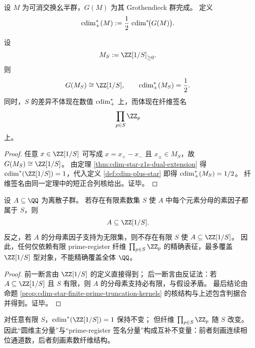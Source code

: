 \begin{definition}[扩展半圆维]\label{def:cdim-plus-star}
设 \(M\) 为可消交换幺半群，\(G(M)\) 为其 Grothendieck 群完成。
定义
\[
\operatorname{cdim}_+^\ast(M):=\frac12\,\operatorname{cdim}^\ast\!\bigl(G(M)\bigr).
\]
\end{definition}

\begin{proposition}[局部化正锥的半圆维与素数签名]\label{prop:cdim-plus-star-localized-cone}
设
\[
M_S:=\ZZ[1/S]_{\ge 0}.
\]
则
\[
G(M_S)\cong \ZZ[1/S],\qquad
\cdim_+^\ast(M_S)=\frac12.
\]
同时，\(S\) 的差异不体现在数值 \(\operatorname{cdim}_+^\ast\) 上，而体现在纤维签名
\[
\prod_{p\in S}\ZZ_p
\]
上。
\end{proposition}
\begin{proof}
任意 \(x\in \ZZ[1/S]\) 可写成 \(x=x_+-x_-\) 且 \(x_\pm\in M_S\)，故 \(G(M_S)\cong \ZZ[1/S]\)。
由定理 \ref{thm:cdim-star-z1s-dual-extension} 得 \(\cdim^\ast(\ZZ[1/S])=1\)，代入定义 \ref{def:cdim-plus-star} 即得 \(\operatorname{cdim}_+^\ast(M_S)=1/2\)。
纤维签名由同一定理中的短正合列核给出。证毕。
\end{proof}

\begin{corollary}\label{cor:cdim-star-finite-prime-register-limit}
设 \(A\subseteq \QQ\) 为离散子群。
若存在有限素数集 \(S\) 使 \(A\) 中每个元素分母的素因子都属于 \(S\)，则
\[
A\subseteq \ZZ[1/S].
\]
反之，若 \(A\) 的分母素因子支持为无限集，则不存在有限 \(S\) 使 \(A\subseteq \ZZ[1/S]\)。
因此，任何仅依赖有限 prime-register 纤维
\(
\prod_{p\in S}\ZZ_p
\)
的精确表征，最多覆盖 \(\ZZ[1/S]\) 型对象，不能精确覆盖全体 \(\QQ\)。
\end{corollary}
\begin{proof}
前一断言由 \(\ZZ[1/S]\) 的定义直接得到；
后一断言由反证法：若 \(A\subseteq \ZZ[1/S]\) 且 \(S\) 有限，则 \(A\) 的分母素支持必有限，与假设矛盾。
最后结论由命题 \ref{prop:cdim-star-finite-prime-truncation-kernels} 的核结构与上述包含判据合并得到。证毕。
\end{proof}

\begin{remark}[主分量与签名分量的分离]\label{rem:cdim-star-main-vs-signature}
对任意有限 \(S\)，\(\cdim^\ast(\ZZ[1/S])=1\) 保持不变；
但纤维 \(\prod_{p\in S}\ZZ_p\) 随 \(S\) 改变。
因此“圆维主分量”与“prime-register 签名分量”构成互补不变量：前者刻画连续相位通道数，后者刻画素数纤维结构。
\end{remark}

\endinput
